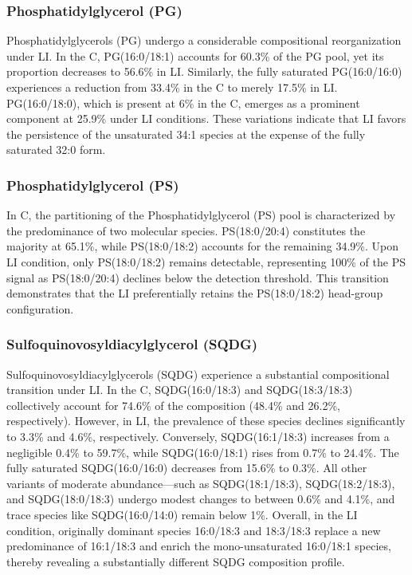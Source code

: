\documentclass[10pt,letterpaper]{article}
\begin{document}
\begin{itemize}
\subsubsection*{Phosphatidylglycerol (PG)} 
Phosphatidylglycerols (PG) undergo a considerable compositional reorganization under LI. In the  C, PG(16:0/18:1) accounts for 60.3\% of the PG pool, yet its proportion decreases to 56.6\% in LI. Similarly, the fully saturated PG(16:0/16:0) experiences a reduction from 33.4\% in the C to merely 17.5\% in LI. PG(16:0/18:0), which is present at 6\% in the C, emerges as a prominent component at 25.9\% under LI conditions. These variations indicate that LI favors the persistence of the unsaturated 34:1 species at the expense of the fully saturated 32:0 form.

\subsubsection*{Phosphatidylglycerol (PS)} 
In C, the partitioning of the Phosphatidylglycerol (PS) pool is characterized by the predominance of two molecular species. PS(18:0/20:4) constitutes the majority at 65.1\%, while PS(18:0/18:2) accounts for the remaining 34.9\%. Upon LI condition, only PS(18:0/18:2) remains detectable, representing 100\% of the PS signal as PS(18:0/20:4) declines below the detection threshold. This transition demonstrates that the LI preferentially retains the PS(18:0/18:2) head-group configuration.

\subsubsection*{Sulfoquinovosyldiacylglycerol (SQDG)} 
Sulfoquinovosyldiacylglycerols (SQDG) experience a substantial compositional transition under LI. In the C, SQDG(16:0/18:3) and SQDG(18:3/18:3) collectively account for 74.6\% of the composition (48.4\% and 26.2\%, respectively). However, in LI, the prevalence of these species declines significantly to 3.3\% and 4.6\%, respectively. Conversely, SQDG(16:1/18:3) increases from a negligible 0.4\% to 59.7\%, while SQDG(16:0/18:1) rises from 0.7\% to 24.4\%. The fully saturated SQDG(16:0/16:0) decreases from 15.6\% to 0.3\%. All other variants of moderate abundance—such as SQDG(18:1/18:3), SQDG(18:2/18:3), and SQDG(18:0/18:3) undergo modest changes to between 0.6\% and 4.1\%, and trace species like SQDG(16:0/14:0) remain below 1\%. Overall, in the LI condition, originally dominant species 16:0/18:3 and 18:3/18:3 replace a new predominance of 16:1/18:3 and enrich the mono-unsaturated 16:0/18:1 species, thereby revealing a substantially different SQDG composition profile.


\end{itemize}
\end{document}
